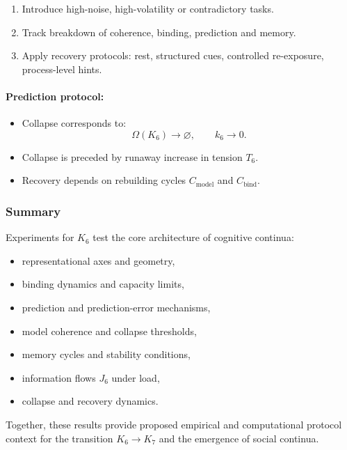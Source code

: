 \begin{enumerate}
    \item Introduce high-noise, high-volatility or contradictory tasks.
    \item Track breakdown of coherence, binding, prediction and memory.
    \item Apply recovery protocols: rest, structured cues,
          controlled re-exposure, process-level hints.
\end{enumerate}

\paragraph{Prediction protocol:}

\begin{itemize}
    \item Collapse corresponds to:
          \[
             \Omega(K_6) \rightarrow \varnothing,
             \qquad k_6 \rightarrow 0.
          \]
    \item Collapse is preceded by runaway increase in tension $T_6$.
    \item Recovery depends on rebuilding cycles $C_{\mathrm{model}}$
          and $C_{\mathrm{bind}}$.
\end{itemize}



\subsubsection{Summary}

Experiments for $K_6$ test the core architecture of cognitive continua:

\begin{itemize}
    \item representational axes and geometry,
    \item binding dynamics and capacity limits,
    \item prediction and prediction-error mechanisms,
    \item model coherence and collapse thresholds,
    \item memory cycles and stability conditions,
    \item information flows $J_6$ under load,
    \item collapse and recovery dynamics.
\end{itemize}

Together, these results provide proposed empirical and computational protocol context for the transition $K_6 \rightarrow K_7$ and the
emergence of social continua.
